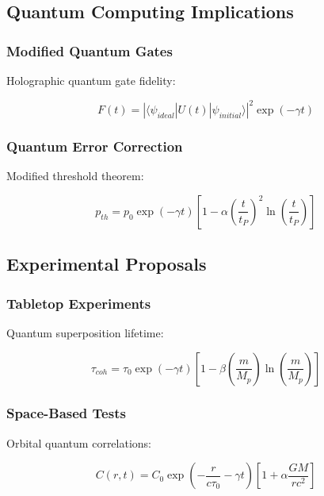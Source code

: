 \documentclass[12pt]{article}
\theoremstyle{plain}
\theoremstyle{definition}
\theoremstyle{remark}
\begin{document}
\subsection{Quantum Computing Implications}

\subsubsection{Modified Quantum Gates}

Holographic quantum gate fidelity:

\begin{equation}
F(t) = |\langle\psi_{ideal}|U(t)|\psi_{initial}\rangle|^2\exp(-\gamma t)
\end{equation}

\subsubsection{Quantum Error Correction}

Modified threshold theorem:

\begin{equation}
p_{th} = p_0\exp(-\gamma t)\left[1 - \alpha\left(\frac{t}{t_P}\right)^2\ln\left(\frac{t}{t_P}\right)\right]
\end{equation}

\subsection{Experimental Proposals}

\subsubsection{Tabletop Experiments}

Quantum superposition lifetime:

\begin{equation}
\tau_{coh} = \tau_0\exp(-\gamma t)\left[1 - \beta\left(\frac{m}{M_p}\right)\ln\left(\frac{m}{M_p}\right)\right]
\end{equation}

\subsubsection{Space-Based Tests}

Orbital quantum correlations:

\begin{equation}
C(r,t) = C_0\exp\left(-\frac{r}{c\tau_0} - \gamma t\right)\left[1 + \alpha\frac{GM}{rc^2}\right]
\end{equation}
\end{document}
